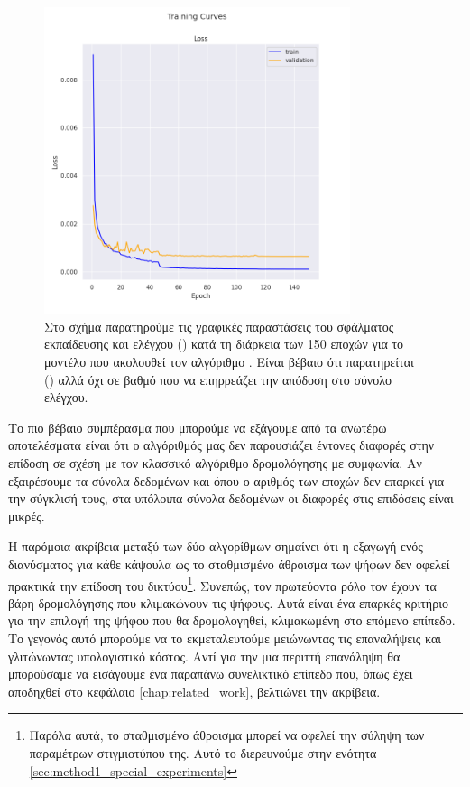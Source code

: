\begin{figure}[h]
    \centering
    \includegraphics[width=0.8\textwidth]{images/chapter experiments/method 1/image 5/train_curve.png}
    \caption{Στο σχήμα παρατηρούμε τις γραφικές παραστάσεις του σφάλματος εκπαίδευσης και ελέγχου () κατά τη διάρκεια των 150 εποχών για το μοντέλο που ακολουθεί τον αλγόριθμο . Είναι βέβαιο ότι παρατηρείται () αλλά όχι σε βαθμό που να επηρρεάζει την απόδοση στο σύνολο ελέγχου.}
    \label{fig:exp_method_1_best_alg}
  \end{figure}

Το πιο βέβαιο συμπέρασμα που μπορούμε να εξάγουμε από τα ανωτέρω αποτελέσματα είναι ότι ο αλγόριθμός μας  δεν παρουσιάζει έντονες διαφορές στην επίδοση σε σχέση με τον κλασσικό αλγόριθμο δρομολόγησης με συμφωνία. Αν εξαιρέσουμε τα σύνολα δεδομένων  και  όπου ο αριθμός των εποχών δεν επαρκεί για την σύγκλισή τους, στα υπόλοιπα σύνολα δεδομένων οι διαφορές στις επιδόσεις είναι μικρές.\par

Η παρόμοια ακρίβεια μεταξύ των δύο αλγορίθμων σημαίνει ότι η εξαγωγή ενός διανύσματος για κάθε κάψουλα  ως το σταθμισμένο άθροισμα των ψήφων δεν οφελεί πρακτικά την επίδοση του δικτύου\footnote{Παρόλα αυτά, το σταθμισμένο άθροισμα μπορεί να οφελεί την σύληψη των παραμέτρων στιγμιοτύπου της. Αυτό το διερευνούμε στην ενότητα \ref{sec:method1_special_experiments}}. Συνεπώς, τον πρωτεύοντα ρόλο τον έχουν τα βάρη δρομολόγησης που κλιμακώνουν τις ψήφους. Αυτά είναι ένα επαρκές κριτήριο για την επιλογή της ψήφου που θα δρομολογηθεί, κλιμακωμένη στο επόμενο επίπεδο. Το γεγονός αυτό μπορούμε να το εκμεταλευτούμε μειώνωντας τις επαναλήψεις και γλιτώνωντας υπολογιστικό κόστος. Αντί για την μια περιττή επανάληψη θα μπορούσαμε να εισάγουμε ένα παραπάνω συνελικτικό επίπεδο που, όπως έχει αποδηχθεί στο κεφάλαιο \ref{chap:related_work}, βελτιώνει την ακρίβεια.\par 

